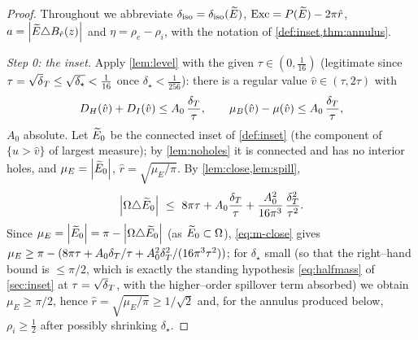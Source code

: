 \begin{proof}
Throughout we abbreviate $\delta_{\mathrm{iso}}=\delta_{\mathrm{iso}}(\widetilde{E})$, $\mathrm{Exc}=P(\widetilde{E})-2\pi\hat r$,
$a=\left\lvert\widetilde{E}\triangle B_{\hat r}(z)\right\rvert$ and $\eta=\rho_e-\rho_i$, with the
notation of \cref{def:inset,thm:annulus}.

\emph{Step 0: the inset.} Apply \cref{lem:level} with the given $\tau\in
(0,\tfrac1{16})$ (legitimate since $\tau=\sqrt\dT\le\sqrt{\delta_\star}<
\tfrac1{16}$ once $\delta_\star<\tfrac1{256}$): there is a regular value
$\hat v\in(\tau,2\tau)$ with
\begin{equation}\label{eq:m-good}
   D_H(\hat v)+D_I(\hat v)\le A_0\,\frac{\delta_T}\tau,
   \qquad
   \mu_B(\hat v)-\mu(\hat v)\le A_0\,\frac{\delta_T}\tau,
\end{equation}
$A_0$ absolute. Let $\widetilde{E}_0$ be the connected inset of \cref{def:inset} (the
component of $\{u>\hat v\}$ of largest measure); by \cref{lem:noholes} it is
connected and has no interior holes, and $\mu_E=\left\lvert\widetilde{E}_0\right\rvert$,
$\hat r=\sqrt{\mu_E/\pi}$. By \cref{lem:close,lem:spill},
\begin{equation}\label{eq:m-close}
   \left\lvert\Omega\triangle\widetilde{E}_0\right\rvert\ \le\ 8\pi\tau+A_0\frac{\delta_T}\tau
       +\frac{A_0^2}{16\pi^3}\,\frac{\delta_T^2}{\tau^2}.
\end{equation}
Since $\mu_E=\left\lvert\widetilde{E}_0\right\rvert=\pi-\left\lvert\Omega\triangle\widetilde{E}_0\right\rvert$ (as $\widetilde{E}_0\subset\Omega$),
\eqref{eq:m-close} gives $\mu_E\ge\pi-(8\pi\tau+A_0\delta_T/\tau+A_0^2\delta_T^2/
(16\pi^3\tau^2))$; for $\delta_\star$ small (so that the right--hand bound is
$\le\pi/2$, which is exactly the standing hypothesis \eqref{eq:halfmass} of
\cref{sec:inset} at $\tau=\sqrt\dT$, with the higher--order spillover term
absorbed) we obtain $\mu_E\ge\pi/2$, hence $\hat r=\sqrt{\mu_E/\pi}\ge1/\sqrt2$
and, for the annulus produced below, $\rho_i\ge\tfrac12$ after possibly
shrinking $\delta_\star$.


\end{proof}
